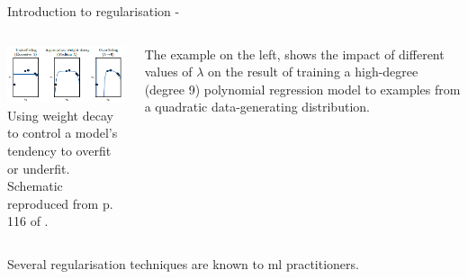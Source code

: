 \begin{frame}[t,allowframebreaks]{Introduction to regularisation -}
\begin{columns}
    \begin{column}{0.72\textwidth}
        \begin{center}
            \includegraphics[width=0.99\textwidth]
                {./images/training_issues/goodfellow17_regularisation_weigh_decay_example_1.png}\\
            \vspace{0.0cm}
            {\tiny 
                Using weight decay to control a model's tendency to overfit or underfit.\\
                \color{col:attribution} 
                Schematic reproduced from p. 116 of \cite{Goodfellow:2017MITDL}.\\
            }
        \end{center}        
    \end{column}
    \begin{column}{0.28\textwidth}
        {\scriptsize
        The example on the left, 
        shows the impact of different values of $\lambda$ 
        on the result of training a high-degree (degree 9) 
        polynomial regression model
        to examples from a quadratic data-generating distribution.\\
        }
    \end{column}
\end{columns}

\framebreak

%
%

Several \gls{regularisation} 
techniques are known to \gls{ml} practitioners.\\
\vspace{0.3cm}


\end{frame}
